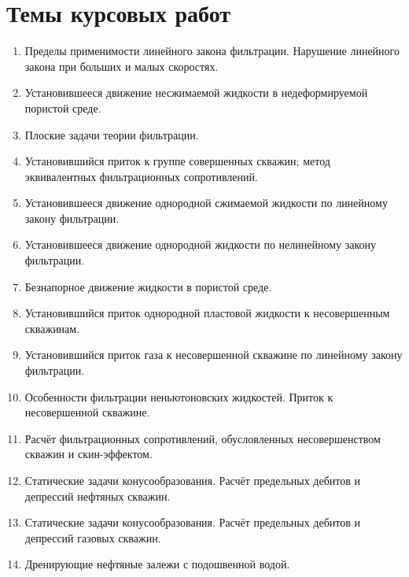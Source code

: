 \documentclass[12pt,a4paper]{article}
\begin{document}
	\section*{Темы курсовых работ}

	\begin{enumerate}

		\item Пределы применимости линейного закона фильтрации. Нарушение линейного закона при больших и малых скоростях.

		\item Установившееся движение несжимаемой жидкости в недеформируемой пористой среде.

		\item Плоские задачи теории фильтрации.

		\item Установившийся приток к группе совершенных скважин; метод эквивалентных фильтрационных сопротивлений.

		\item Установившееся движение однородной сжимаемой жидкости по линейному закону фильтрации.

		\item Установившееся движение однородной жидкости по нелинейному закону фильтрации.

		\item Безнапорное движение жидкости в пористой среде.

		\item Установившийся приток однородной пластовой жидкости к несовершенным скважинам.

		\item Установившийся приток газа к несовершенной скважине по линейному закону фильтрации.

		\item Особенности фильтрации неньютоновских жидкостей. Приток к несовершенной скважине.

		\item Расчёт фильтрационных сопротивлений, обусловленных несовершенством скважин и скин-эффектом.

		\item Статические задачи конусообразования. Расчёт предельных дебитов и депрессий нефтяных скважин.

		\item Статические задачи конусообразования. Расчёт предельных дебитов и депрессий газовых скважин.

		\item Дренирующие нефтяные залежи с подошвенной водой.


\end{enumerate}
\end{document}
